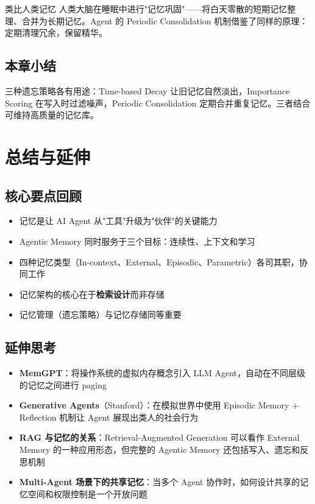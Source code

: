 \documentclass[a4paper]{article}
\begin{document}
\begin{knowledgebox}{类比人类记忆}
人类大脑在睡眠中进行"记忆巩固"——将白天零散的短期记忆整理、合并为长期记忆。Agent 的 Periodic Consolidation 机制借鉴了同样的原理：定期清理冗余，保留精华。
\end{knowledgebox}

\subsection{本章小结}

三种遗忘策略各有用途：Time-based Decay 让旧记忆自然淡出，Importance Scoring 在写入时过滤噪声，Periodic Consolidation 定期合并重复记忆。三者结合可维持高质量的记忆库。

\section{总结与延伸}

\subsection{核心要点回顾}

\begin{itemize}[leftmargin=2em]
    \item 记忆是让 AI Agent 从"工具"升级为"伙伴"的关键能力
    \item Agentic Memory 同时服务于三个目标：连续性、上下文和学习
    \item 四种记忆类型（In-context、External、Episodic、Parametric）各司其职，协同工作
    \item 记忆架构的核心在于\textbf{检索设计}而非存储
    \item 记忆管理（遗忘策略）与记忆存储同等重要
\end{itemize}

\subsection{延伸思考}

\begin{itemize}[leftmargin=2em]
    \item \textbf{MemGPT}：将操作系统的虚拟内存概念引入 LLM Agent，自动在不同层级的记忆之间进行 paging
    \item \textbf{Generative Agents}（Stanford）：在模拟世界中使用 Episodic Memory + Reflection 机制让 Agent 展现出类人的社会行为
    \item \textbf{RAG 与记忆的关系}：Retrieval-Augmented Generation 可以看作 External Memory 的一种应用形态，但完整的 Agentic Memory 还包括写入、遗忘和反思机制
    \item \textbf{Multi-Agent 场景下的共享记忆}：当多个 Agent 协作时，如何设计共享的记忆空间和权限控制是一个开放问题
\end{itemize}

\end{document}
